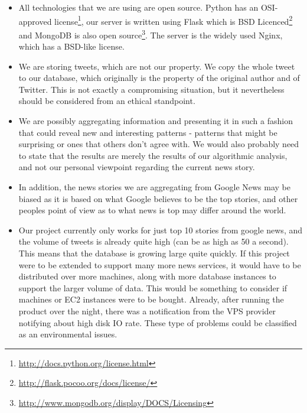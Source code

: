 \documentclass[a4paper,12pt]{article}
\begin{document}
	\begin{itemize}
	  
	  \item All technologies that we are using are open source. Python has an OSI-approved license\footnote{\url {http://docs.python.org/license.html}}, our server is written using Flask which is BSD Licenced\footnote{\url{http://flask.pocoo.org/docs/license/}} and MongoDB is also open source\footnote{\url{http://www.mongodb.org/display/DOCS/Licensing}}. The server is the widely used Nginx, which has a BSD-like license.
	  
		\item We are storing tweets, which are not our property. We copy the whole tweet to our database, which originally is the property of the original author and of Twitter. This is not exactly a compromising situation, but it nevertheless should be considered from an ethical standpoint.
		
		\item We are possibly aggregating information and presenting it in such a fashion that could reveal new and interesting patterns - patterns that might be surprising or ones that others don't agree with. We would also probably need to state that the results are merely the results of our algorithmic analysis, and not our personal viewpoint regarding the current news story.
		
		\item In addition, the news stories we are aggregating from Google News may be biased as it is based on what Google believes to be the top stories, and other peoples point of view as to what news is top may differ around the world.
		
		\item Our project currently only works for just top 10 stories from google news, and the volume of tweets is already quite high (can be as high as 50 a second). This means that the database is growing large quite quickly. If this project were to be extended to support many more news services, it would have to be distributed over more machines, along with more database instances to support the larger volume of data. This would be something to consider if machines or EC2 instances were to be bought. Already, after running the product over the night, there was a notification from the VPS provider notifying about high disk IO rate. These type of problems could be classified as an environmental issues. 
	  
	  
  \end{itemize}
  
\end{document}
